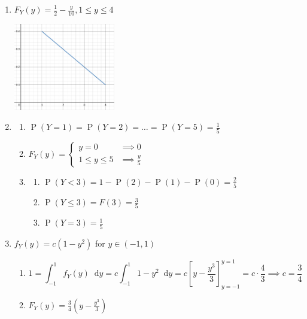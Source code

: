 \documentclass{article}
\title{\MakeUppercase{\jobname}}
\author{Justin Nguyen}
\date{\today}
\newcommand{\pr}[1]{\operatorname{P}\left(#1\right)}
\newcommand*\diff{\mathop{}\!\mathrm{d}}
\newcommand{\intv}[4]{\int_{#3}^{#4} #1 \diff #2}
\begin{document}
\maketitle


\begin{enumerate}
  \item $F_Y(y) = \frac{1}{2} - \frac{y}{10}, 1 \leq y \leq 4$
  \begin{center}
    \includegraphics*[height=1.5in]{fYgraph.png}
  \end{center}
  
  \item \begin{enumerate}
    \item $\pr{Y=1} = \pr{Y = 2} = \ldots = \pr{Y = 5} = \frac{1}{5}$
    \item $F_Y(y) = \begin{cases}
      y = 0 & \implies 0\\
      1 \leq y \leq 5 & \implies \frac{y}{5}
    \end{cases}$
    \item \begin{enumerate}
      \item $\pr{Y < 3} = 1 - \pr{2} - \pr{1} - \pr{0} = \frac{2}{5}$
      \item $\pr{Y \leq 3} = F(3) = \frac{3}{5}$
      \item $\pr{Y = 3} = \frac{1}{5}$
    \end{enumerate}
  \end{enumerate}

  \item $f_Y(y) = c(1-y^2)$ for $y\in(-1,1)$
  \begin{enumerate}
    \item \[
      1 = \intv{f_Y(y)}{y}{-1}{1} = 
      c\intv{1-y^2}{y}{-1}{1} = 
      c\left[ y-\frac{y^3}{3} \right]_{y=-1}^{y=1} = c\cdot \frac{4}{3} \implies c = \frac{3}{4}
    \]
    \item $F_Y(y) = \frac{3}{4}(y-\frac{y^3}{3})$
  \end{enumerate}


\end{enumerate}
\end{document}
